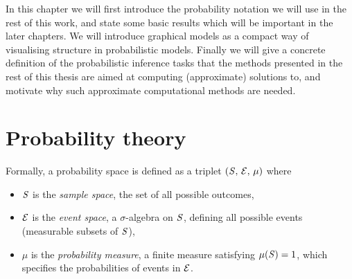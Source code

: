 In this chapter we will first introduce the probability notation we will use in the rest of this work, and state some basic results which will be important in the later chapters. We will introduce graphical models as a compact way of visualising structure in probabilistic models. Finally we will give a concrete definition of the probabilistic inference tasks that the methods presented in the rest of this thesis are aimed at computing (approximate) solutions to, and motivate why such approximate computational methods are needed.


\section{Probability theory}

Formally, a probability space is defined as a triplet $(\mathit{S},\,\mathcal{E},\,\mu)$ where

\begin{itemize}
  \item $\mathit{S}$ is the \emph{sample space}, the set of all possible outcomes,
  \item $\mathcal{E}$ is the \emph{event space}, a $\sigma$-algebra on $\mathit{S}$, defining all possible events (measurable subsets of $\mathit{S}$),
  \item $\mu$ is the \emph{probability measure}, a finite measure satisfying $\mu(\mathit{S}) = 1$, which specifies the probabilities of events in $\mathcal{E}$.
\end{itemize}

